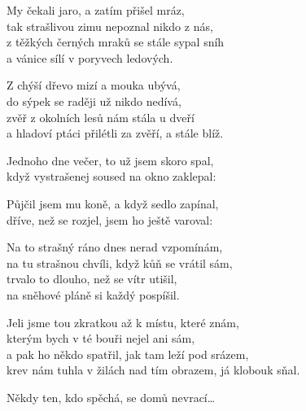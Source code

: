 
\ve{}
My čekali jaro, a zatím přišel mráz,\\
tak strašlivou zimu nepoznal nikdo z nás,\\
z těžkých černých mraků se stále sypal sníh\\
a vánice sílí v poryvech ledových.

Z chýší dřevo mizí a mouka ubývá,\\
do sýpek se raději už nikdo nedívá,\\
zvěř z okolních lesů nám stála u dveří\\
a hladoví ptáci přilétli za zvěří, a stále blíž.

\ve{}
Jednoho dne večer, to už jsem skoro spal,\\
když vystrašenej soused na okno zaklepal:\\

Půjčil jsem mu koně, a když sedlo zapínal,\\
dříve, než se rozjel, jsem ho ještě varoval:\\

\ve{}
Na to strašný ráno dnes nerad vzpomínám,\\
na tu strašnou chvíli, když kůň se vrátil sám,\\
trvalo to dlouho, než se vítr utišil,\\
na sněhové pláně si každý pospíšil.

Jeli jsme tou zkratkou až k místu, které znám,\\
kterým bych v té bouři nejel ani sám,\\
a pak ho někdo spatřil, jak tam leží pod srázem,\\
krev nám tuhla v žilách nad tím obrazem, já klobouk sňal.

\ve{}
Někdy ten, kdo spěchá, se domů nevrací\ldots

\esong